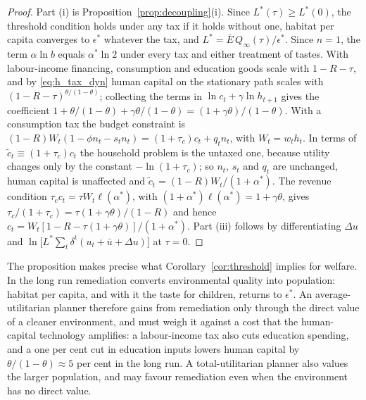 \documentclass[11pt]{article}
\begin{document}
\begin{proof}
Part (i) is Proposition~\ref{prop:decoupling}(i). Since $L^\ast(\tau)\ge L^\ast(0)$, the threshold
condition holds under any tax if it holds without one, habitat per capita converges to $\epsilon^\ast$
whatever the tax, and $L^\ast=\bar E\,Q_\infty(\tau)/\epsilon^\ast$. Since $n=1$, the term $\alpha\ln b$ equals
$\alpha^\ast\ln2$ under every tax and either treatment of tastes. With labour-income financing, consumption and education goods scale
with $1-R-\tau$, and by \eqref{eq:h_tax_dyn} human capital on the stationary path scales with
$(1-R-\tau)^{\theta/(1-\theta)}$; collecting the terms in $\ln c_t+\gamma\ln h_{t+1}$ gives the coefficient
$1+\theta/(1-\theta)+\gamma\theta/(1-\theta)=(1+\gamma\theta)/(1-\theta)$. With a consumption tax the budget
constraint is $(1-R)W_t(1-\phi n_t-s_tn_t)=(1+\tau_c)c_t+q_tn_t$, with $W_t=w_th_t$. In terms of
$\tilde c_t\equiv(1+\tau_c)c_t$ the household problem is the untaxed one, because utility changes only by
the constant $-\ln(1+\tau_c)$; so $n_t$, $s_t$ and $q_t$ are unchanged, human capital is unaffected and
$\tilde c_t=(1-R)W_t/(1+\alpha^\ast)$. The revenue condition $\tau_c c_t=\tau W_t\ell(\alpha^\ast)$, with
$(1+\alpha^\ast)\ell(\alpha^\ast)=1+\gamma\theta$, gives $\tau_c/(1+\tau_c)=\tau(1+\gamma\theta)/(1-R)$ and hence
$c_t=W_t\left[1-R-\tau(1+\gamma\theta)\right]/(1+\alpha^\ast)$. Part (iii) follows by differentiating
$\Delta u$ and $\ln\big[L^\ast\sum_t\delta^t(u_t+\bar u+\Delta u)\big]$ at $\tau=0$.
\end{proof}

The proposition makes precise what Corollary~\ref{cor:threshold} implies for welfare. In the
long run remediation converts environmental quality into population: habitat per capita, and with it
the taste for children, returns to $\epsilon^\ast$. An average-utilitarian planner therefore gains from
remediation only through the direct value of a cleaner environment, and must weigh it against a cost
that the human-capital technology amplifies: a labour-income tax also cuts education spending, and a
one per cent cut in education inputs lowers human capital by $\theta/(1-\theta)\approx5$ per cent in the
long run. A total-utilitarian planner also values the larger population, and may favour remediation even
when the environment has no direct value.
\end{document}
